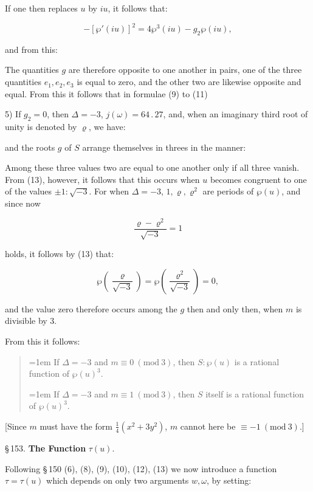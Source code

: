
If one then replaces $u$ by $iu$, it follows that:

\[
-[\wp'(iu)]^2 = 4\wp^3(iu) - g_2 \wp(iu),
\]

and from this:


The quantities $g$ are therefore opposite to one another in pairs, one of the three quantities $e_1, e_2, e_3$ is equal to zero, and the other two are likewise opposite and equal. From this it follows that in formulae (9) to (11) 

5) If $g_2 = 0$, then $\Delta = -3$, $j(\omega) = 64\,.\,27$, and, when an imaginary third root of unity is denoted by $\varrho$, we have:


and the roots $g$ of $S$ arrange themselves in threes in the manner:


Among these three values two are equal to one another only if all three vanish. From (13), however, it follows that this occurs when $u$ becomes congruent to one of the values $\pm 1 : \sqrt{-3}$. For when $\Delta = -3$, $1, \varrho, \varrho^2$ are periods of $\wp(u)$, and since now

\[
\frac{\varrho - \varrho^2}{\sqrt{-3}} = 1
\]

holds, it follows by (13) that:

\[
\wp\left(\frac{\varrho}{\sqrt{-3}}\right) = \wp\left(\frac{\varrho^2}{\sqrt{-3}}\right) = 0,
\]

and the value zero therefore occurs among the $g$ then and only then, when $m$ is divisible by 3.

From this it follows:

\begin{quote}
\hangindent=1em
If $\Delta = -3$ and $m \equiv 0 \ (\mathrm{mod}\ 3)$, then $S : \wp(u)$ is a rational function of $\wp(u)^3$.

\hangindent=1em
If $\Delta = -3$ and $m \equiv 1 \ (\mathrm{mod}\ 3)$, then $S$ itself is a rational function of $\wp(u)^3$.
\end{quote}

[Since $m$ must have the form $\frac{1}{4}(x^2 + 3y^2)$, $m$ cannot here be $\equiv -1 \ (\mathrm{mod}\ 3)$.]

\begin{center}
§\,153. \textbf{The Function} $\tau(u)$.
\end{center}

Following §\,150 (6), (8), (9), (10), (12), (13) we now introduce a function $\tau = \tau(u)$ which depends on only two arguments $w, \omega$, by setting:
